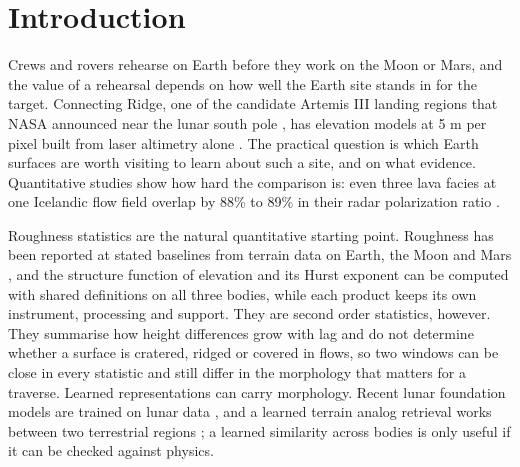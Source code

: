 \section{Introduction}
\label{sec:introduction}

Crews and rovers rehearse on Earth before they work on the Moon or Mars, and the value of a
rehearsal depends on how well the Earth site stands in for the target. Connecting Ridge, one of
the candidate Artemis III landing regions that NASA announced near the lunar south pole \citep{nasa2022artemis}, has elevation models at 5 m per pixel built from laser altimetry alone \citep{barker2021}. The
practical question is which Earth surfaces are worth visiting to learn about such a site, and on
what evidence. Quantitative studies show how hard the comparison is: even three lava facies at
one Icelandic flow field overlap by 88\% to 89\% in their radar polarization ratio
\citep{tolometti2022holuhraun}.

Roughness statistics are the natural quantitative starting point. Roughness has been reported at stated baselines from terrain data on Earth, the Moon and Mars \citep{shepard2001,rosenburg2011,kreslavsky2000}, and the structure function of elevation and its Hurst exponent can be computed with shared definitions on all three bodies, while each product keeps its own instrument, processing and support. They are second order statistics, however. They summarise how height
differences grow with lag and do not determine whether a surface is cratered, ridged or covered in flows, so two windows can be close in every statistic and still differ in the morphology that matters for a traverse. Learned representations can carry morphology. Recent lunar foundation models are trained on lunar data \citep{gironamata2026,fraccaro2026}, and a learned terrain analog retrieval works between two terrestrial regions \citep{liu2026}; a learned similarity across bodies is only useful if it can be checked against physics.

